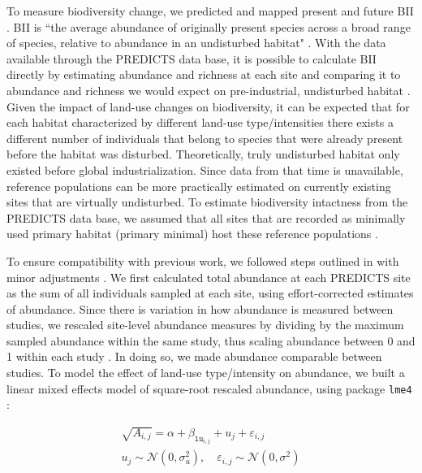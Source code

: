 \documentclass[titlesmallcaps,copyrightpage]{uomthesis}\usepackage[]{graphicx}\usepackage[]{color}
\begin{document}
To measure biodiversity change, we predicted and mapped present and future BII \citep{scholes_biodiversity_2005}. BII is ``the average abundance of originally present species across a broad range of species, relative to abundance in an undisturbed habitat" \citep{newbold_has_2016}. With the data available through the PREDICTS data base, it is possible to calculate BII directly by estimating abundance and richness at each site and comparing it to abundance and richness we would expect on pre-industrial, undisturbed habitat \citep{newbold_has_2016, de_palma_calculating_2019}. Given the impact of land-use changes on biodiversity, it can be expected that for each habitat characterized by different land-use type/intensities there exists a different number of individuals that belong to species that were already present before the habitat was disturbed. Theoretically, truly undisturbed habitat only existed before global industrialization. Since data from that time is unavailable, reference populations can be more practically estimated on currently existing sites that are virtually undisturbed. To estimate biodiversity intactness from the PREDICTS data base, we assumed that all sites that are recorded as minimally used primary habitat (primary minimal) host these reference populations \citep{newbold_global_2015}.

To ensure compatibility with previous work, we followed steps outlined in \citet{de_palma_calculating_2019} with minor adjustments \citep[also applied in][]{newbold_has_2016}. We first calculated total abundance at each PREDICTS site as the sum of all individuals sampled at each site, using effort-corrected estimates of abundance. Since there is variation in how abundance is measured between studies, we rescaled site-level abundance measures by dividing by the maximum sampled abundance within the same study, thus scaling abundance between 0 and 1 within each study \citep{de_palma_calculating_2019}. In doing so, we made abundance comparable between studies. To model the effect of land-use type/intensity on abundance, we built a linear mixed effects model of square-root rescaled abundance, using package \texttt{lme4} \citep{bates_fitting_2015}:

\begin{equation}
\begin{aligned}
\sqrt{A_{i, j}} = \alpha + \beta_{\texttt{lu}_{i, j}} + u_{j} + \varepsilon_{i,j} \\
u_{j} \sim \mathcal N(0, \sigma_u^2), \quad \varepsilon_{i,j} \sim \mathcal N(0, \sigma^2)
\end{aligned}
\end{equation}
\end{document}
